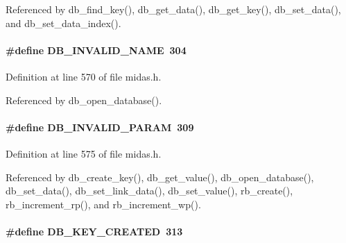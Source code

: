Referenced by db\_\-find\_\-key(), db\_\-get\_\-data(), db\_\-get\_\-key(), db\_\-set\_\-data(), and db\_\-set\_\-data\_\-index().
\paragraph[{DB\_\-INVALID\_\-NAME}]{\setlength{\rightskip}{0pt plus 5cm}\#define DB\_\-INVALID\_\-NAME~304}\hfill\label{group__err23_ga871ab09b39556a4328e80497ed13088b}

\begin{DoxyItemize}
\item 
\end{DoxyItemize}

Definition at line 570 of file midas.h.

Referenced by db\_\-open\_\-database().
\paragraph[{DB\_\-INVALID\_\-PARAM}]{\setlength{\rightskip}{0pt plus 5cm}\#define DB\_\-INVALID\_\-PARAM~309}\hfill\label{group__err23_ga3190934848311dc41f20d5e4ce285339}

\begin{DoxyItemize}
\item 
\end{DoxyItemize}

Definition at line 575 of file midas.h.

Referenced by db\_\-create\_\-key(), db\_\-get\_\-value(), db\_\-open\_\-database(), db\_\-set\_\-data(), db\_\-set\_\-link\_\-data(), db\_\-set\_\-value(), rb\_\-create(), rb\_\-increment\_\-rp(), and rb\_\-increment\_\-wp().
\paragraph[{DB\_\-KEY\_\-CREATED}]{\setlength{\rightskip}{0pt plus 5cm}\#define DB\_\-KEY\_\-CREATED~313}\hfill\label{group__err23_ga2d57548d0380a9cd53ba2cc16184705f}

\begin{DoxyItemize}
\item 
\end{DoxyItemize}

